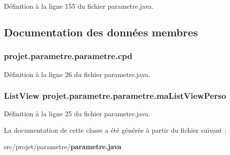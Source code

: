 \-Définition à la ligne 155 du fichier parametre.\-java.



\subsection{\-Documentation des données membres}
\subsubsection[{cpd}]{ {\bf projet.\-parametre.\-parametre.\-cpd}\hspace{0.3cm}{\ttfamily  [package]}}\label{classprojet_1_1parametre_1_1parametre_a8c669f79621e8774e6ba38b74c731a8e}


\-Définition à la ligne 26 du fichier parametre.\-java.

\subsubsection[{ma\-List\-View\-Perso}]{\setlength{\rightskip}{0pt plus 5cm}\-List\-View {\bf projet.\-parametre.\-parametre.\-ma\-List\-View\-Perso}\hspace{0.3cm}{\ttfamily  [private]}}\label{classprojet_1_1parametre_1_1parametre_a52d9002144b97518750a58372940e121}


\-Définition à la ligne 25 du fichier parametre.\-java.



\-La documentation de cette classe a été générée à partir du fichier suivant \-:\begin{DoxyCompactItemize}
\item 
src/projet/parametre/{\bf parametre.\-java}\end{DoxyCompactItemize}
